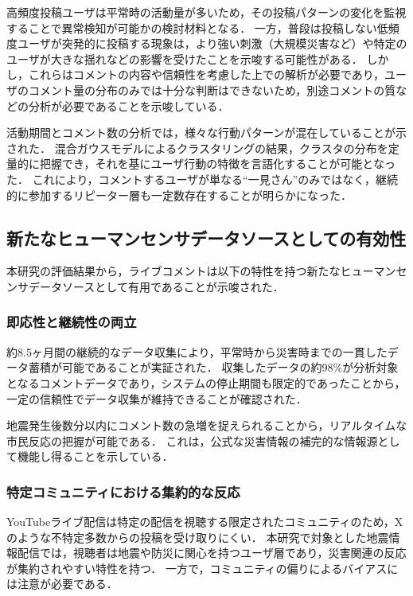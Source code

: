 高頻度投稿ユーザは平常時の活動量が多いため，その投稿パターンの変化を監視することで異常検知が可能かの検討材料となる．
一方，普段は投稿しない低頻度ユーザが突発的に投稿する現象は，より強い刺激（大規模災害など）や特定のユーザが大きな揺れなどの影響を受けたことを示唆する可能性がある．
しかし，これらはコメントの内容や信頼性を考慮した上での解析が必要であり，ユーザのコメント量の分布のみでは十分な判断はできないため，別途コメントの質などの分析が必要であることを示唆している．

活動期間とコメント数の分析では，様々な行動パターンが混在していることが示された．
混合ガウスモデルによるクラスタリングの結果，クラスタの分布を定量的に把握でき，それを基にユーザ行動の特徴を言語化することが可能となった．
これにより，コメントするユーザが単なる``一見さん''のみではなく，継続的に参加するリピーター層も一定数存在することが明らかになった．

\subsection{新たなヒューマンセンサデータソースとしての有効性}

本研究の評価結果から，ライブコメントは以下の特性を持つ新たなヒューマンセンサデータソースとして有用であることが示唆された．

\subsubsection{即応性と継続性の両立}

約8.5ヶ月間の継続的なデータ収集により，平常時から災害時までの一貫したデータ蓄積が可能であることが実証された．
収集したデータの約98\%が分析対象となるコメントデータであり，システムの停止期間も限定的であったことから，一定の信頼性でデータ収集が維持できることが確認された．

地震発生後数分以内にコメント数の急増を捉えられることから，リアルタイムな市民反応の把握が可能である．
これは，公式な災害情報の補完的な情報源として機能し得ることを示している．

\subsubsection{特定コミュニティにおける集約的な反応}

YouTubeライブ配信は特定の配信を視聴する限定されたコミュニティのため，Xのような不特定多数からの投稿を受け取りにくい．
本研究で対象とした地震情報配信では，視聴者は地震や防災に関心を持つユーザ層であり，災害関連の反応が集約されやすい特性を持つ．
一方で，コミュニティの偏りによるバイアスには注意が必要である．

